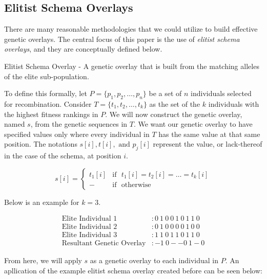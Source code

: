 \subsection*{Elitist Schema Overlays}
There are many reasonable methodologies that we could utilize to build effective genetic overlays. The central focus of this paper is the use of \emph{elitist schema overlays}, and they are conceptually defined below.

\begin{overlay}
Elitist Schema Overlay - A genetic overlay that is built from the matching alleles of the elite sub-population.
\end{overlay}

To define this formally, let $P = \{p_1,p_2,\ldots,p_n\}$ be a set of $n$ individuals selected for recombination. Consider $T=\{t_1,t_2,\ldots,t_k\}$ as the set of the $k$ individuals with the highest fitness rankings in $P$. We will now construct the genetic overlay, named $s$, from the genetic sequences in $T$. We want our genetic overlay to  have specified values only where every individual in $T$ has the same value at that same position. The notations $s[i], t[i], \text{ and } p_j[i]$ represent the value, or lack-thereof in the case of the schema, at position $i$. 
 
 \begin{displaymath}
   s[i] = \left\{
     \begin{array}{cl}
       t_1[i] & \text{if~ } t_1[i] = t_2[i] = \ldots = t_k[i] \\
       - & \text{if~ } \text{otherwise} 
     \end{array}
   \right.
\end{displaymath} 

\noindent Below is an example for $k = 3$.

\begin{figure}[h!]
\centering 
\begin{align*}
\text{Elite Individual 1} &: 0~1~0~0~1~0~1~1~0 			\\
\text{Elite Individual 2} &: 0~1~0~0~0~0~1~0~0 			\\
\text{Elite Individual 3} &: 1~1~0~1~1~0~1~1~0 			\\  
\text{Resultant Genetic Overlay} &:   -1~0--0~1-0			
\end{align*}
\end{figure}

From here, we will apply $s$ as a genetic overlay to each individual in $P$. An apllication of the example elitist schema overlay created before can be seen below:

